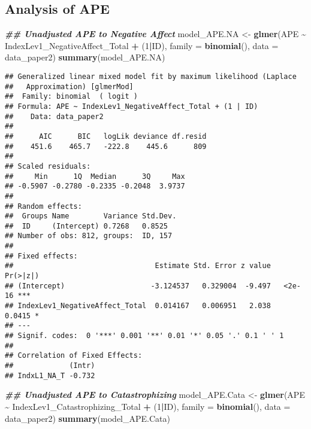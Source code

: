\documentclass[
  12pt,
]{article}
\newenvironment{Shaded}{\begin{snugshade}}{\end{snugshade}}
\newcommand{\AttributeTok}[1]{\textcolor[rgb]{0.13,0.29,0.53}{#1}}
\newcommand{\DecValTok}[1]{\textcolor[rgb]{0.00,0.00,0.81}{#1}}
\newcommand{\DocumentationTok}[1]{\textcolor[rgb]{0.56,0.35,0.01}{\textbf{\textit{#1}}}}
\newcommand{\FunctionTok}[1]{\textcolor[rgb]{0.13,0.29,0.53}{\textbf{#1}}}
\newcommand{\NormalTok}[1]{#1}
\newcommand{\OtherTok}[1]{\textcolor[rgb]{0.56,0.35,0.01}{#1}}
\newcommand{\SpecialCharTok}[1]{\textcolor[rgb]{0.81,0.36,0.00}{\textbf{#1}}}
\begin{document}
\hypertarget{analysis-of-ape}{%
\subsection{Analysis of APE}\label{analysis-of-ape}}

\begin{Shaded}
\begin{Highlighting}[]
\DocumentationTok{\#\# Unadjusted APE to Negative Affect}
\NormalTok{model\_APE.NA }\OtherTok{\textless{}{-}} \FunctionTok{glmer}\NormalTok{(APE }\SpecialCharTok{\textasciitilde{}}\NormalTok{ IndexLev1\_NegativeAffect\_Total }\SpecialCharTok{+}\NormalTok{ (}\DecValTok{1}\SpecialCharTok{|}\NormalTok{ID), }\AttributeTok{family =} \FunctionTok{binomial}\NormalTok{(), }\AttributeTok{data =}\NormalTok{ data\_paper2)}
\FunctionTok{summary}\NormalTok{(model\_APE.NA)}
\end{Highlighting}
\end{Shaded}

\begin{verbatim}
## Generalized linear mixed model fit by maximum likelihood (Laplace
##   Approximation) [glmerMod]
##  Family: binomial  ( logit )
## Formula: APE ~ IndexLev1_NegativeAffect_Total + (1 | ID)
##    Data: data_paper2
## 
##      AIC      BIC   logLik deviance df.resid 
##    451.6    465.7   -222.8    445.6      809 
## 
## Scaled residuals: 
##     Min      1Q  Median      3Q     Max 
## -0.5907 -0.2780 -0.2335 -0.2048  3.9737 
## 
## Random effects:
##  Groups Name        Variance Std.Dev.
##  ID     (Intercept) 0.7268   0.8525  
## Number of obs: 812, groups:  ID, 157
## 
## Fixed effects:
##                                 Estimate Std. Error z value Pr(>|z|)    
## (Intercept)                    -3.124537   0.329004  -9.497   <2e-16 ***
## IndexLev1_NegativeAffect_Total  0.014167   0.006951   2.038   0.0415 *  
## ---
## Signif. codes:  0 '***' 0.001 '**' 0.01 '*' 0.05 '.' 0.1 ' ' 1
## 
## Correlation of Fixed Effects:
##             (Intr)
## IndxL1_NA_T -0.732
\end{verbatim}

\begin{Shaded}
\begin{Highlighting}[]
 \DocumentationTok{\#\# Unadjusted APE to Catastrophizing}
\NormalTok{model\_APE.Cata }\OtherTok{\textless{}{-}} \FunctionTok{glmer}\NormalTok{(APE }\SpecialCharTok{\textasciitilde{}}\NormalTok{ IndexLev1\_Catastrophizing\_Total }\SpecialCharTok{+}\NormalTok{ (}\DecValTok{1}\SpecialCharTok{|}\NormalTok{ID), }\AttributeTok{family =} \FunctionTok{binomial}\NormalTok{(), }\AttributeTok{data =}\NormalTok{ data\_paper2)}
\FunctionTok{summary}\NormalTok{(model\_APE.Cata)}
\end{Highlighting}
\end{Shaded}
\end{document}

